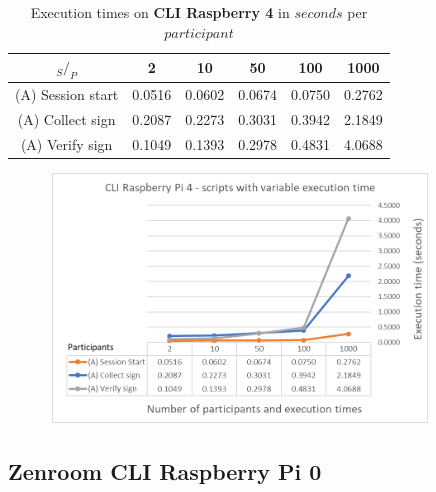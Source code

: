 \documentclass[twocolumn]{article}
\begin{document}
\begin{table}[h!]
  \begin{center}
    \caption{Execution times on \textbf{CLI Raspberry 4} in $seconds$ per $participant$}
      \label{tab:table1}
        \begin{tabular} {c|c|c|c|c|c}
          \toprule
           \textbf{$_S / _P$} & \textbf{2} & \textbf{10} & \textbf{50} & \textbf{100} & \textbf{1000} \\
          \midrule
          (A) Session start & 0.0516 & 0.0602 & 0.0674 & 0.0750 & 0.2762 \\
          (A) Collect sign & 0.2087 & 0.2273 & 0.3031 & 0.3942 & 2.1849 \\
          (A) Verify sign & 0.1049 & 0.1393 & 0.2978 & 0.4831 & 4.0688 \\
      \bottomrule %
    \end{tabular}
  \end{center}
\end{table}

\begin{figure}[h!]
    \centering
    \includegraphics[width=4in, height=2.6in]{graphs/CLIRaspi4.png}
    \label{fig:galaxy}
\end{figure}



\pagebreak
\newpage

\subsection*{Zenroom CLI Raspberry Pi 0}
\end{document}
